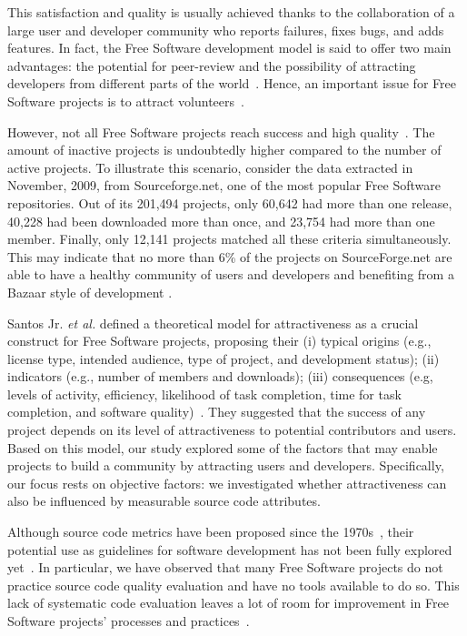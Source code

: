 \documentclass[conference]{IEEEtran}
\begin{document}
This satisfaction and quality is usually achieved thanks to the collaboration
of a large user and developer community who reports failures,
fixes bugs, and adds features.
%
In fact, the Free Software development model is said to offer two main advantages:
the potential for peer-review and the possibility of attracting developers
from different parts of the world~\cite{Michlmayr2005}.
%
Hence, an important issue for Free Software projects is to attract volunteers~\cite{Stewart2006}.

However, not all Free Software projects reach success and high quality~\cite{Michlmayr2005}.
The amount of inactive projects is undoubtedly higher compared to the number of active projects.
%
To illustrate this scenario, consider the data extracted in November, 2009,
from Sourceforge.net, one of the most popular Free Software repositories.
Out of its 201,494 projects, only 60,642 had more than one
release, 40,228 had been downloaded more than once, and 23,754 had more than one member.
%
Finally, only 12,141 projects matched all these criteria simultaneously.
This may indicate that no more than 6\% of the projects on
SourceForge.net are able to have a healthy community of users
and developers and benefiting from a Bazaar style of development
\cite{CatedralBazzar}.

Santos Jr. \emph{et al.} defined a theoretical model for attractiveness as
a crucial construct for Free Software projects, proposing their
(i) typical origins (e.g., license type, intended audience, type of project, and development status);
(ii) indicators (e.g., number of members and downloads);
(iii) consequences (e.g, levels of activity, efficiency, likelihood of task completion,
time for task completion, and software quality)~\cite{Santos2010}.
%
They suggested that the success of any project depends on
its level of attractiveness to potential contributors and users.
%
Based on this model, our study explored some of the factors that may enable projects to build
a community by attracting users and developers. Specifically, our focus rests on objective factors:
we investigated whether attractiveness can also be influenced by measurable
source code attributes.

Although source code metrics have been proposed since the 1970s~\cite{SEI88},
their potential use as guidelines for software development has not
been fully explored yet~\cite{Tempero}.
%
In particular, we have observed that many Free Software projects do not practice
source code quality evaluation and have no tools available to do so.
%
This lack of systematic code evaluation leaves a lot of room for improvement
in Free Software projects' processes and practices~\cite{Michlmayr2005}.
\end{document}
